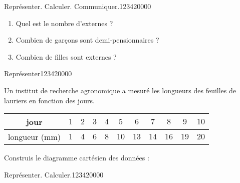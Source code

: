 \begin{pageParcoursd}
\begin{ExoCd}{Représenter. Calculer. Communiquer.}{1234}{2}{0}{0}{0}{0}
\begin{enumerate}[leftmargin=*]
 \item Quel est le nombre d'externes ?  
 \item Combien de garçons sont demi-pensionnaires ?  
 \item Combien de filles sont externes ? 
\end{enumerate}

\end{ExoCd}
 
 
\end{pageParcoursd}

\begin{pageParcourst}

 
\begin{ExoCt}{Représenter}{1234}{2}{0}{0}{0}{0}
 
 
Un institut de recherche agronomique a mesuré les longueurs des feuilles de lauriers en fonction des jours.

 \begin{center}
 \begin{tabular}{|c|c|c|c|c|c|c|c|c|c|c|} \hline
  jour  & $1$ & $2$ & $3$ & $4$ & $5$ & $6$ & $7$ & $8$ & $9$ & $10$   \\  \hline
  longueur (mm) & $1$ & $4$ & $6$ & $8$ & $10$ & $13$& $14$ & $16$ &$19$ &$20$\\\hline
 \end{tabular}
 \end{center}
 
 Construis le diagramme cartésien des données :
 

 \end{ExoCt}

\begin{ExoCt}{Représenter. Calculer.}{1234}{2}{0}{0}{0}{0}


\end{ExoCt}
\end{pageParcourst}
